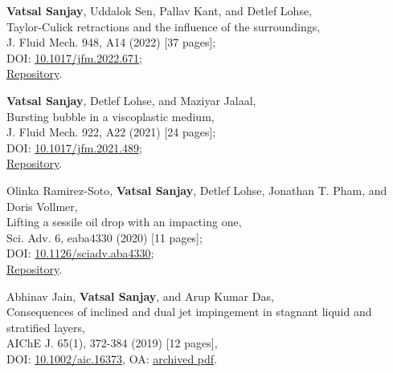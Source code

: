 \documentclass[10pt,a4paper,colorlinks,linkcolor=blue,urlcolor=blue,citecolor=blue]{moderncv}
\begin{document}
\begin{enumerate}[leftmargin=1.5em,label=\textbf{[\arabic*]}]
	\item \textbf{Vatsal Sanjay}, Uddalok Sen, Pallav Kant, and Detlef Lohse,\\
	Taylor-Culick retractions and the influence of the surroundings,\\
	J. Fluid Mech. 948, A14 (2022) [37 pages];\\
	\faFile\hspace{0.2em}DOI: \href{https://doi.org/10.1017/jfm.2022.671}{10.1017/jfm.2022.671};\\
	\faGithub\hspace{0.2em}\href{https://github.com/VatsalSy/Taylor-Culick-retractions}{Repository}.

	\item \textbf{Vatsal Sanjay}, Detlef Lohse, and Maziyar Jalaal,\\
	Bursting bubble in a viscoplastic medium,\\
	J. Fluid Mech. 922, A22 (2021) [24 pages];\\
	\faFile\hspace{0.2em}DOI: \href{https://doi.org/10.1017/jfm.2021.489}{10.1017/jfm.2021.489};\\
	\faGithub\hspace{0.2em}\href{https://github.com/VatsalSy/Bursting-Bubble-In-a-Viscoplastic-Medium}{Repository}.

	\item Olinka Ramirez-Soto, \textbf{Vatsal Sanjay}, Detlef Lohse, Jonathan T. Pham, and Doris Vollmer,\\
	Lifting a sessile oil drop with an impacting one,\\
	Sci. Adv. 6, eaba4330 (2020) [11 pages];\\
	\faFile\hspace{0.2em}DOI: \href{https://doi.org/10.1126/sciadv.aba4330}{10.1126/sciadv.aba4330};\\
	\faGithub\hspace{0.2em}\href{https://github.com/VatsalSy/Lifting-a-sessile-drop}{Repository}.

	\item Abhinav Jain, \textbf{Vatsal Sanjay}, and Arup Kumar Das,\\
	Consequences of inclined and dual jet impingement in stagnant liquid and stratified layers,\\
	AIChE J. 65(1), 372-384 (2019) [12 pages],\\
	\faLock\hspace{0.2em}DOI: \href{https://doi.org/10.1002/aic.16373}{10.1002/aic.16373}, \faFile\hspace{0.2em}OA: \href{https://tinyurl.com/24p5dy8s}{archived pdf}.


\end{enumerate}
\end{document}

